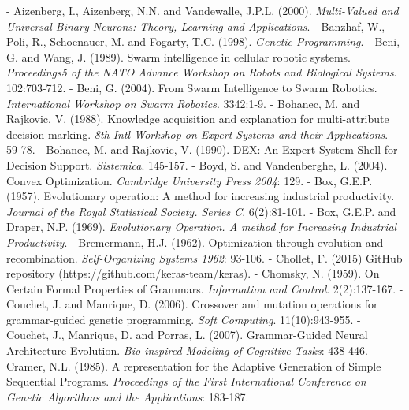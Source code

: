 \documentclass[spanish,a4paper,12pt,twoside]{report}
\begin{document}
  \newpage\cleardoublepage
  
  \begin{thebibliography}{00}
  \vspace{-1cm}
  \makeatletter
  \def\@biblabel#1{}
  \let\old@bibitem\bibitem
  \def\bibitem#1{\old@bibitem{#1}\leavevmode\kern-\bibindent}
  \makeatother
  
   Aizenberg, I., Aizenberg, N.N. and Vandewalle, J.P.L. (2000). \emph{Multi-Valued and Universal Binary Neurons: Theory, Learning and Applications}.
   Banzhaf, W., Poli, R., Schoenauer, M. and Fogarty, T.C. (1998). \emph{Genetic Programming}.
   Beni, G. and Wang, J. (1989). Swarm intelligence in cellular robotic systems. \emph{Proceedings5 of the NATO Advance Workshop on Robots and Biological Systems}. 102:703-712.
   Beni, G. (2004). From Swarm Intelligence to Swarm Robotics. \emph{International Workshop on Swarm Robotics}. 3342:1-9.
   Bohanec, M. and Rajkovic, V. (1988). Knowledge acquisition and explanation for multi-attribute decision marking. \emph{8th Intl Workshop on Expert Systems and their Applications}. 59-78.
   Bohanec, M. and Rajkovic, V. (1990). DEX: An Expert System Shell for Decision Support. \emph{Sistemica}. 145-157.
   Boyd, S. and Vandenberghe, L. (2004). Convex Optimization. \emph{Cambridge University Press 2004}: 129.
   Box, G.E.P. (1957). Evolutionary operation: A method for increasing industrial productivity. \emph{Journal of the Royal Statistical Society. Series C}. 6(2):81-101.
   Box, G.E.P. and Draper, N.P. (1969). \emph{Evolutionary Operation. A method for Increasing Industrial Productivity}.
   Bremermann, H.J. (1962). Optimization through evolution and recombination. \emph{Self-Organizing Systems 1962}: 93-106.
   Chollet, F. (2015) GitHub repository (https://github.com/keras-team/keras).
   Chomsky, N. (1959). On Certain Formal Properties of Grammars. \emph{Information and Control}. 2(2):137-167.
   Couchet, J. and Manrique, D. (2006). Crossover and mutation operations for grammar-guided genetic programming. \emph{Soft Computing}. 11(10):943-955.
   Couchet, J., Manrique, D. and Porras, L. (2007). Grammar-Guided Neural Architecture Evolution. \emph{Bio-inspired Modeling of Cognitive Tasks}: 438-446.
   Cramer, N.L. (1985). A representation for the Adaptive Generation of Simple Sequential Programs. \emph{Proceedings of the First International Conference on Genetic Algorithms and the Applications}: 183-187.

\end{thebibliography}
\end{document}
